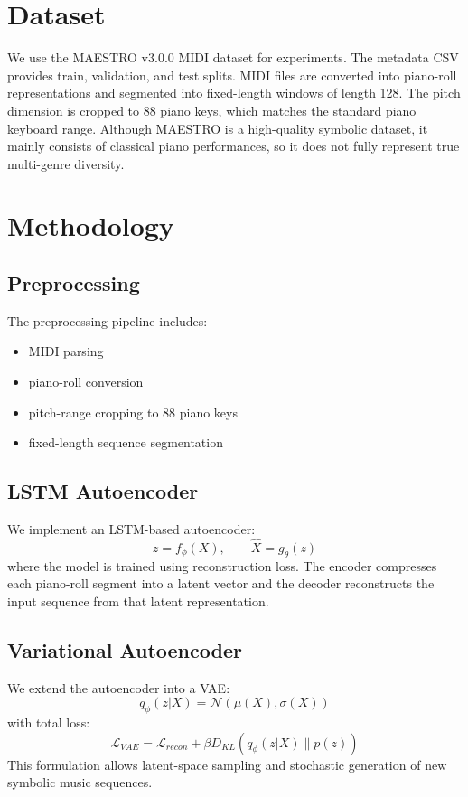 \documentclass[conference]{IEEEtran}
\begin{document}
\section{Dataset}
We use the MAESTRO v3.0.0 MIDI dataset for experiments. The metadata CSV provides train, validation, and test splits. MIDI files are converted into piano-roll representations and segmented into fixed-length windows of length 128. The pitch dimension is cropped to 88 piano keys, which matches the standard piano keyboard range. Although MAESTRO is a high-quality symbolic dataset, it mainly consists of classical piano performances, so it does not fully represent true multi-genre diversity.

\section{Methodology}

\subsection{Preprocessing}
The preprocessing pipeline includes:
\begin{itemize}
    \item MIDI parsing
    \item piano-roll conversion
    \item pitch-range cropping to 88 piano keys
    \item fixed-length sequence segmentation
\end{itemize}

\subsection{LSTM Autoencoder}
We implement an LSTM-based autoencoder:
\[
z = f_{\phi}(X), \qquad \hat{X} = g_{\theta}(z)
\]
where the model is trained using reconstruction loss. The encoder compresses each piano-roll segment into a latent vector and the decoder reconstructs the input sequence from that latent representation.

\subsection{Variational Autoencoder}
We extend the autoencoder into a VAE:
\[
q_{\phi}(z|X)=\mathcal{N}(\mu(X), \sigma(X))
\]
with total loss:
\[
\mathcal{L}_{VAE} = \mathcal{L}_{recon} + \beta D_{KL}(q_{\phi}(z|X)\|p(z))
\]
This formulation allows latent-space sampling and stochastic generation of new symbolic music sequences.
\end{document}
